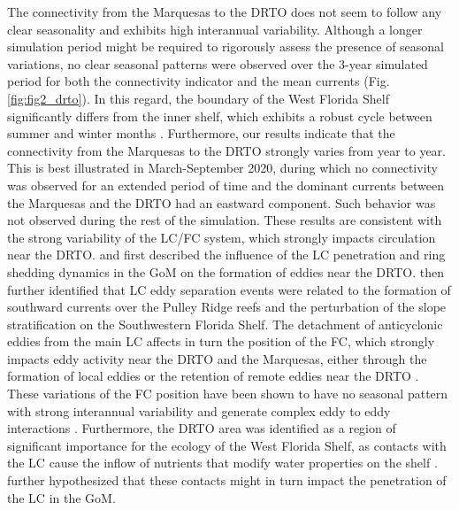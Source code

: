 The connectivity from the Marquesas to the DRTO does not seem to follow any clear seasonality and exhibits high interannual variability. Although a longer simulation period might be required to rigorously assess the presence of seasonal variations, no clear seasonal patterns were observed over the 3-year simulated period for both the connectivity indicator and the mean currents (Fig. \ref{fig:fig2_drto}). In this regard, the boundary of the West Florida Shelf significantly differs from the inner shelf, which exhibits a robust cycle between summer and winter months \citep{liu2012seasonal}. Furthermore, our results indicate that the connectivity from the Marquesas to the DRTO strongly varies from year to year. This is best illustrated in March-September 2020, during which no connectivity was observed for an extended period of time and the dominant currents between the Marquesas and the DRTO had an eastward component. Such behavior was not observed during the rest of the simulation. These results are consistent with the strong variability of the LC/FC system, which strongly impacts circulation near the DRTO. \cite{lee1994evolution} and \cite{fratantoni1998influence} first described the influence of the LC penetration and ring shedding dynamics in the GoM on the formation of eddies near the DRTO. \cite{kourafalou2018physical} then further identified that LC eddy separation events were related to the formation of southward currents over the Pulley Ridge reefs and the perturbation of the slope stratification on the Southwestern Florida Shelf. The detachment of anticyclonic eddies from the main LC affects in turn the position of the FC, which strongly impacts eddy activity near the DRTO and the Marquesas, either through the formation of local eddies or the retention of remote eddies near the DRTO \citep{kourafalou2012florida}. These variations of the FC position have been shown to have no seasonal pattern with strong interannual variability and generate complex eddy to eddy interactions \citep{kourafalou2012florida}. Furthermore, the DRTO area was identified as a region of significant importance for the ecology of the West Florida Shelf, as contacts with the LC cause the inflow of nutrients that modify water properties on the shelf \citep{weisberg2003local,liu2016offshore}. \cite{weisberg2017loop} further hypothesized that these contacts might in turn impact the penetration of the LC in the GoM.

